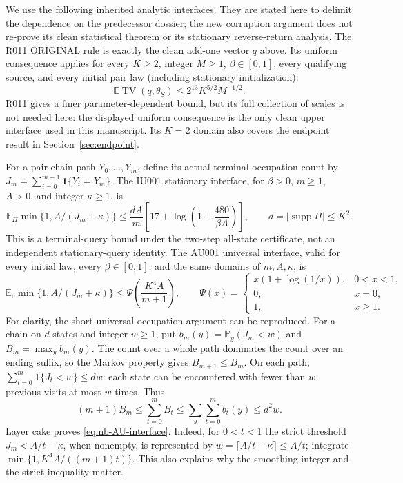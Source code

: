 We use the following inherited analytic interfaces.  They are stated here
to delimit the dependence on the predecessor dossier; the new corruption
argument does not re-prove its clean statistical theorem or its stationary
reverse-return analysis.  The R011 ORIGINAL rule is exactly the clean
add-one vector $q$ above.  Its uniform consequence applies for every
$K\geq2$, integer $M\geq1$, $\beta\in[0,1]$, every qualifying source,
and every initial pair law (including stationary initialization):
\begin{equation}\label{eq:nb-clean-interface}
 \mathbb E\operatorname{TV}(q,\theta_S)
 \leq2^{13}K^{5/2}M^{-1/2}.
\end{equation}
R011 gives a finer parameter-dependent bound, but its full collection
of scales is not needed here: the displayed uniform consequence is the
only clean upper interface used in this manuscript.  Its $K=2$ domain
also covers the endpoint result in Section~\ref{sec:endpoint}.

For a pair-chain path $Y_0,\ldots,Y_m$, define its actual-terminal
occupation count by
$J_m=\sum_{i=0}^{m-1}\mathbf1\{Y_i=Y_m\}$.
The IU001 stationary interface, for $\beta>0$, $m\geq1$, $A>0$, and
integer $\kappa\geq1$, is
\begin{equation}\label{eq:nb-IU-interface}
 \mathbb E_{\Pi}\min\{1,A/(J_m+\kappa)\}
 \leq\frac{dA}{m}\left[17+\log\left(1+\frac{480}{\beta A}\right)\right],
 \qquad d=|\operatorname{supp}\Pi|\leq K^2.
\end{equation}
This is a terminal-query bound under the two-step all-state certificate,
not an independent stationary-query identity.  The AU001 universal
interface, valid for every initial law, every $\beta\in[0,1]$, and the
same domains of $m,A,\kappa$, is
\begin{equation}\label{eq:nb-AU-interface}
 \mathbb E_{\nu}\min\{1,A/(J_m+\kappa)\}
 \leq\Psi\left(\frac{K^4A}{m+1}\right),\qquad
 \Psi(x)=\begin{cases}x(1+\log(1/x)),&0<x<1,\\0,&x=0,\\1,&x\geq1.
 \end{cases}
\end{equation}
For clarity, the short universal occupation argument can be reproduced.
For a chain on $d$ states and integer $w\geq1$, put
$b_m(y)=\mathbb P_y(J_m<w)$ and $B_m=\max_y b_m(y)$.
The count over a whole path dominates the count over an ending suffix,
so the Markov property gives $B_{m+1}\leq B_m$.  On each path,
$\sum_{t=0}^m\mathbf1\{J_t<w\}\leq dw$: each state can be encountered
with fewer than $w$ previous visits at most $w$ times.  Thus
\[
 (m+1)B_m\leq\sum_{t=0}^m B_t
 \leq\sum_y\sum_{t=0}^m b_t(y)\leq d^2w.
\]
Layer cake proves \eqref{eq:nb-AU-interface}.  Indeed, for $0<t<1$ the
strict threshold $J_m<A/t-\kappa$, when nonempty, is represented by
$w=\lceil A/t-\kappa\rceil\leq A/t$; integrate
$\min\{1,K^4A/((m+1)t)\}$.  This also explains why the smoothing
integer and the strict inequality matter.

